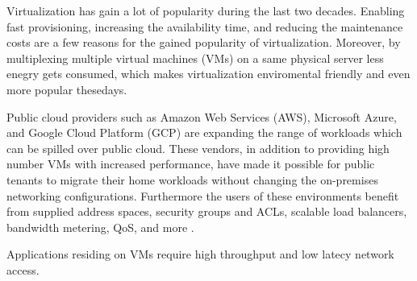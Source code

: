 


Virtualization has gain a lot of popularity during the last two decades. Enabling fast 
provisioning, increasing the availability time, and reducing the maintenance costs
are a few reasons for the gained popularity of virtualization. Moreover, by multiplexing 
multiple virtual machines (VMs) on a same physical server less enegry gets consumed, 
which makes virtualization enviromental friendly and even more popular thesedays.

Public cloud providers such as Amazon Web Services (AWS), Microsoft Azure, and Google Cloud
Platform (GCP) are expanding the range of workloads which can be spilled over public cloud. 
These  vendors, in addition to providing high number VMs with increased performance, have made 
it possible for public tenants to migrate their home workloads without changing the 
on-premises networking configurations. Furthermore the users of these environments
benefit from supplied address spaces, security groups and ACLs, scalable load balancers, 
bandwidth metering, QoS, and more \cite{firestone2017vfp}.


Applications residing on VMs require high throughput and low latecy network access.













